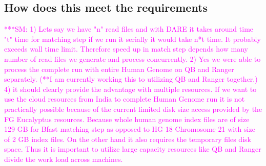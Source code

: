 \documentclass[12pt]{article}
\newcommand{\smnote}[1]{  {\textcolor{magenta} {***SM: #1}}}
\newcommand{\smnote}[1]{}
\begin{document}
\subsection{How does this meet the requirements}
\smnote{ 1) Lets say we have "n" read files and with DARE it takes around time "t" time for matching step if we run it serially it would take n*t time. It probably exceeds wall time limit. Therefore speed up in match step depends how many number of read files we generate and process concurrently.
2) Yes we were able to process the complete run with entire Human Genome on QB and Ranger separately. (**I am currently working this to utilizing QB and Ranger together.) 
4) it should clearly provide the advantage with multiple resources. If we want to use the cloud resources from India to complete Human Genome run it is not practically possible because of the current limited disk size access provided by the FG Eucalyptus resources. Because whole human genome index files are of size 129 GB for Bfast matching step as opposed to HG 18 Chromosome 21 with size of  2 GB index files. On the other hand it also requires the temporary files disk space.  Thus it is important to utilize large capacity resources like QB and Ranger divide the work load across machines.}




\end{document}
